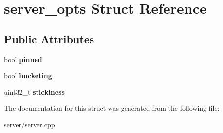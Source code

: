 \hypertarget{structserver__opts}{}\section{server\+\_\+opts Struct Reference}
\label{structserver__opts}
\subsection*{Public Attributes}
\begin{DoxyCompactItemize}
\item 
\mbox{\label{structserver__opts_a3223ccaa4771f89c1a5200eb89535fa2}} 
bool {\bfseries pinned}
\item 
\mbox{\label{structserver__opts_a2021f07c396e9f112c8827a3f6761d38}} 
bool {\bfseries bucketing}
\item 
\mbox{\label{structserver__opts_aa912b4c4e2183f2145e86e14f39c0ca2}} 
uint32\+\_\+t {\bfseries stickiness}
\end{DoxyCompactItemize}


The documentation for this struct was generated from the following file\+:\begin{DoxyCompactItemize}
\item 
server/server.\+cpp\end{DoxyCompactItemize}
